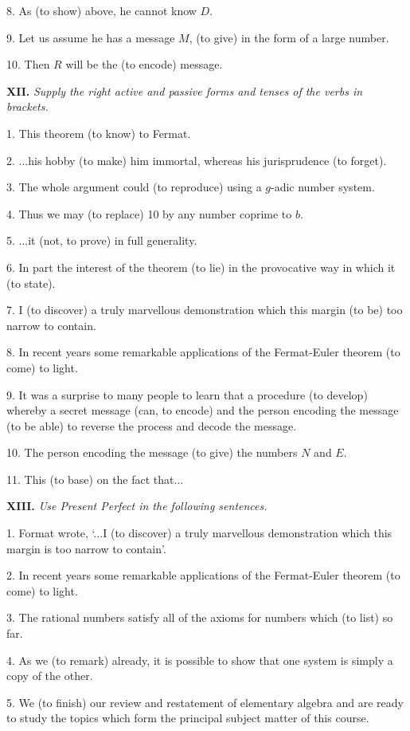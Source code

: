\documentclass[a4paper]{article}
\newcommand{\ETask}[2]{\medskip\par\textbf{#1.} \textit{#2}\par}
\begin{document}
8. As (to show) above, he cannot know $D$.

9. Let us assume he has a message $M$, (to give) in the form of a large number.

10. Then $R$ will be the (to encode) message.

\ETask{XII}{Supply the right active and passive forms and tenses of the verbs in brackets.}

1. This theorem (to know) to Fermat.

2. ...his hobby (to make) him immortal, whereas his jurisprudence (to forget).

3. The whole argument could (to reproduce) using a $g$-adic number system.

4. Thus we may (to replace) 10 by any number coprime to $b$.

5. ...it (not, to prove) in full generality.

6. In part the interest of the theorem (to lie) in the provocative way in which it (to state).

7. I (to discover) a truly marvellous demonstration which this margin (to be) too narrow to contain.

8. In recent years some remarkable applications of the Fermat-Euler theorem (to come) to light.

9. It was a surprise to many people to learn that a procedure (to develop) whereby a secret message (can, to encode) and the
person encoding the message (to be able) to reverse the process and decode the message.

10. The person encoding the message (to give) the numbers $N$ and $E$.

11. This (to base) on the fact that...

\ETask{XIII}{Use Present Perfect in the following sentences.}
1. Format wrote, `...I (to discover) a truly marvellous demonstration which this margin is too narrow to contain'.

2. In recent years some remarkable applications of the Fermat-Euler theorem (to come) to light.

3. The rational numbers satisfy all of the axioms for numbers which (to list) so far.

4. As we (to remark) already, it is possible to show that one system is simply a copy of the other.

5. We (to finish) our review and restatement of elementary algebra and are ready to study the topics which form the principal
subject matter of this course.
\end{document}
